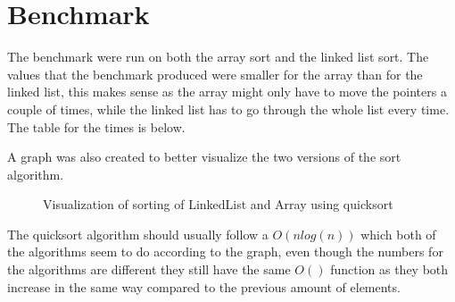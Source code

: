 \documentclass[a4paper,11pt]{article}
\begin{document}
\section*{Benchmark}
The benchmark were run on both the array sort and the linked list sort. The values that the benchmark produced were smaller for the array than for the linked list, 
this makes sense as the array might only have to move the pointers a couple of times, while the linked list has to go through the whole list every time. The table for the times is below.
\begin{table}[h]
    \begin{center}
    \caption{The result of the sorting of a linked list and an array}
    \label{tab:table1}
    \end{center}
\end{table}
\FloatBarrier{\noindent}
A graph was also created to better visualize the two versions of the sort algorithm.
\begin{figure}[h]
    \centering    
    
    \scalebox{0.8}{}
    \caption{Visualization of sorting of LinkedList and Array using quicksort}   
    \label{tab:figure1} 
    
    \end{figure}
\FloatBarrier{\noindent}
The quicksort algorithm should usually follow a $O(nlog(n))$ which both of the algorithms seem to do according to the graph, even though the numbers for the algorithms are 
different they still have the same $O()$ function as they both increase in the same way compared to the previous amount of elements. 
\end{document}
